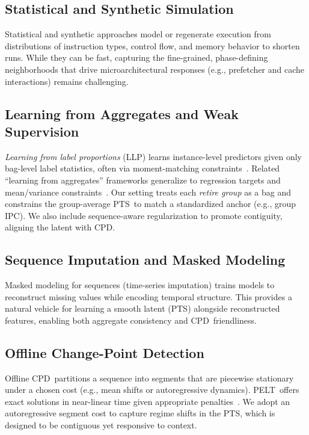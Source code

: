 \documentclass[10pt,journal,compsoc]{IEEEtran}
\newcommand{\pts}{\textsc{PTS}}
\newcommand{\cpd}{\textsc{CPD}}
\newcommand{\pelt}{\textsc{PELT}}
\begin{document}
\subsection{Statistical and Synthetic Simulation}
Statistical and synthetic approaches model or regenerate execution from distributions of instruction types, control flow, and memory behavior to shorten runs. While they can be fast, capturing the fine-grained, phase-defining neighborhoods that drive microarchitectural responses (e.g., prefetcher and cache interactions) remains challenging.
\subsection{Learning from Aggregates and Weak Supervision}
\emph{Learning from label proportions} (LLP) learns instance-level predictors given only bag-level label statistics, often via moment-matching constraints~\cite{yu2014-llp,scott2020-llp}. Related “learning from aggregates” frameworks generalize to regression targets and mean/variance constraints~\cite{law2018-agg,zhang2020-agg}. Our setting treats each \emph{retire group} as a bag and constrains the group-average \pts\ to match a standardized anchor (e.g., group IPC). We also include sequence-aware regularization to promote contiguity, aligning the latent with \cpd.
\subsection{Sequence Imputation and Masked Modeling}
Masked modeling for sequences (time-series imputation) trains models to reconstruct missing values while encoding temporal structure. This provides a natural vehicle for learning a smooth latent (\pts) alongside reconstructed features, enabling both aggregate consistency and \cpd\ friendliness.
\subsection{Offline Change-Point Detection}
Offline \cpd\ partitions a sequence into segments that are piecewise stationary under a chosen cost (e.g., mean shifts or autoregressive dynamics). \pelt\ offers exact solutions in near-linear time given appropriate penalties~\cite{pelt12,ruptures20}. We adopt an autoregressive segment cost to capture regime shifts in the \pts, which is designed to be contiguous yet responsive to context.
\end{document}
